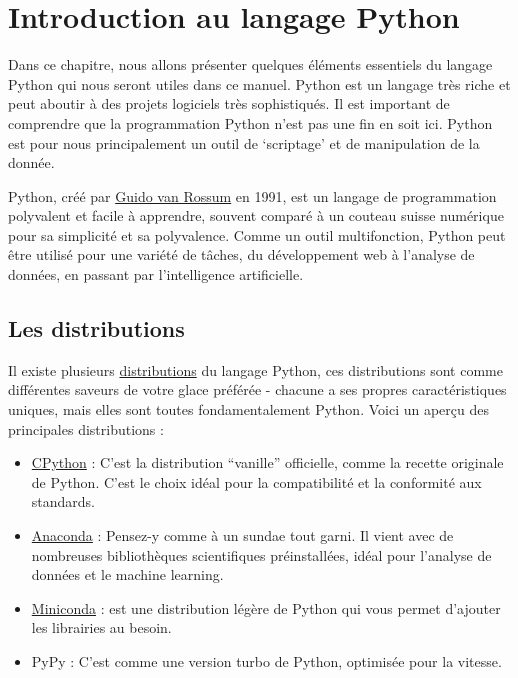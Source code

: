 \documentclass[
  letterpaper,
  DIV=11,
  numbers=noendperiod]{scrreprt}
\begin{document}

\chapter{Introduction au langage Python}\label{sec-chap00}

Dans ce chapitre, nous allons présenter quelques éléments essentiels du
langage Python qui nous seront utiles dans ce manuel. Python est un
langage très riche et peut aboutir à des projets logiciels très
sophistiqués. Il est important de comprendre que la programmation Python
n'est pas une fin en soit ici. Python est pour nous principalement un
outil de `scriptage' et de manipulation de la donnée.

Python, créé par
\href{https://en.wikipedia.org/wiki/Guido_van_Rossum}{Guido van Rossum}
en 1991, est un langage de programmation polyvalent et facile à
apprendre, souvent comparé à un couteau suisse numérique pour sa
simplicité et sa polyvalence. Comme un outil multifonction, Python peut
être utilisé pour une variété de tâches, du développement web à
l'analyse de données, en passant par l'intelligence artificielle.

\section{Les distributions}\label{les-distributions}

Il existe plusieurs
\href{https://wiki.python.org/moin/PythonDistributions}{distributions}
du langage Python, ces distributions sont comme différentes saveurs de
votre glace préférée - chacune a ses propres caractéristiques uniques,
mais elles sont toutes fondamentalement Python. Voici un aperçu des
principales distributions :

\begin{itemize}
\item
  \href{https://www.python.org/downloads/}{CPython} : C'est la
  distribution ``vanille'' officielle, comme la recette originale de
  Python. C'est le choix idéal pour la compatibilité et la conformité
  aux standards.
\item
  \href{https://www.anaconda.com/download}{Anaconda} : Pensez-y comme à
  un sundae tout garni. Il vient avec de nombreuses bibliothèques
  scientifiques préinstallées, idéal pour l'analyse de données et le
  machine learning.
\item
  \href{https://docs.anaconda.com/miniconda/miniconda-install/}{Miniconda}
  : est une distribution légère de Python qui vous permet d'ajouter les
  librairies au besoin.
\item
  PyPy : C'est comme une version turbo de Python, optimisée pour la
  vitesse.
\end{itemize}
\end{document}
